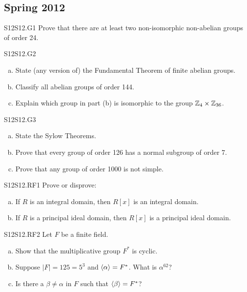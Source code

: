 \documentclass[../AlgebraQualSolutions.tex]{subfiles}
\begin{document}
	\subsection{Spring 2012}


	\begin{prob}{S12}{S12.G1}
		Prove that there are at least two non-isomorphic non-abelian groups of order 24.
	\end{prob}

	\begin{prob}{S12}{S12.G2}
		\begin{enumerate}[(a)]
			\item State (any version of) the Fundamental Theorem of finite abelian groups.
			\item Classify all abelian groups of order 144.
			\item Explain which group in part (b) is isomorphic to the group $\mathbb{Z}_4 \times \mathbb{Z}_{36}$.
		\end{enumerate}
	\end{prob}

	\begin{prob}{S12}{S12.G3}
		\begin{enumerate}[(a)]
			\item State the Sylow Theorems.
			\item Prove that every group of order 126 has a normal subgroup of order 7.
			\item Prove that any group of order 1000 is not simple.
		\end{enumerate}
	\end{prob}

	\begin{prob}{S12}{S12.RF1}
		Prove or disprove:

		\begin{enumerate}[(a)]
			\item If $R$ is an integral domain, then $R[x]$ is an integral domain.
			\item If $R$ is a principal ideal domain, then $R[x]$ is a principal ideal domain.
		\end{enumerate}
	\end{prob}

	\begin{prob}{S12}{S12.RF2}
		Let $F$ be a finite field.

		\begin{enumerate}[(a)]
			\item Show that the multiplicative group $F^*$ is cyclic.
			\item Suppose $|F| = 125 = 5^3$ and $\langle \alpha \rangle = F^*$. What is $\alpha^{62}$?
			\item Is there a $\beta \neq \alpha$ in $F$ such that $\langle \beta \rangle = F^*$?
		\end{enumerate}
	\end{prob}
\end{document}
